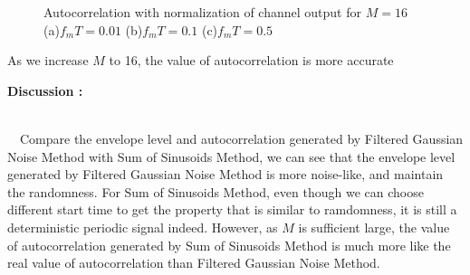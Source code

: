 \documentclass{article}
\begin{document}
\begin{flushleft}
\begin{enumerate}
\newpage
\begin{figure}[H]
\centering
{}
\caption{Autocorrelation with normalization of channel output for $M=16$  (a)$f_mT=0.01$ (b)$f_mT=0.1$ (c)$f_mT=0.5$}
\end{figure}
As we increase $M$ to 16, the value of autocorrelation is more accurate

\newpage
{\Large \item  \bf Discussion : }\\
\ \ Compare the envelope level and autocorrelation generated by Filtered Gaussian Noise Method with Sum of Sinusoids Method, we can see that the envelope level generated by Filtered Gaussian Noise Method is more noise-like, and maintain the randomness. For Sum of Sinusoids Method, even though we can choose different start time to get the property that is similar to ramdomness, it is still a deterministic periodic signal indeed.
However, as $M$ is sufficient large, the value of autocorrelation generated by  Sum of Sinusoids Method is much more like the real value of autocorrelation than Filtered Gaussian Noise Method.

\end{enumerate}
\end{flushleft}
\end{document}
